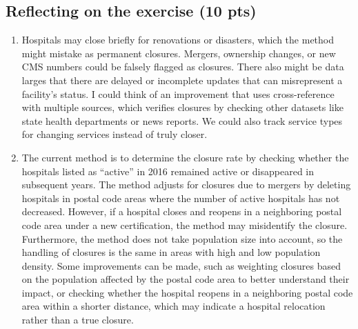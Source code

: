 \documentclass[
  letterpaper,
  DIV=11,
  numbers=noendperiod]{scrartcl}
\begin{document}
\subsection{Reflecting on the exercise (10
pts)}\label{reflecting-on-the-exercise-10-pts}

\begin{enumerate}
\def\labelenumi{\arabic{enumi}.}
\item
  Hospitals may close briefly for renovations or disasters, which the
  method might mistake as permanent closures. Mergers, ownership
  changes, or new CMS numbers could be falsely flagged as closures.
  There also might be data larges that there are delayed or incomplete
  updates that can misrepresent a facility's status. I could think of an
  improvement that uses cross-reference with multiple sources, which
  verifies closures by checking other datasets like state health
  departments or news reports. We could also track service types for
  changing services instead of truly closer.
\item
  The current method is to determine the closure rate by checking
  whether the hospitals listed as ``active'' in 2016 remained active or
  disappeared in subsequent years. The method adjusts for closures due
  to mergers by deleting hospitals in postal code areas where the number
  of active hospitals has not decreased. However, if a hospital closes
  and reopens in a neighboring postal code area under a new
  certification, the method may misidentify the closure. Furthermore,
  the method does not take population size into account, so the handling
  of closures is the same in areas with high and low population density.
  Some improvements can be made, such as weighting closures based on the
  population affected by the postal code area to better understand their
  impact, or checking whether the hospital reopens in a neighboring
  postal code area within a shorter distance, which may indicate a
  hospital relocation rather than a true closure.
\end{enumerate}
\end{document}
